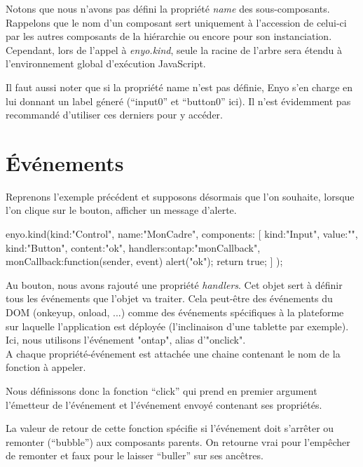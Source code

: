 \documentclass[11pt,a4paper]{report}
\begin{document}
Notons que nous n'avons pas défini la propriété \emph{name} des sous-composants. 
Rappelons que le nom d'un composant sert uniquement à l'accession de celui-ci par les 
autres composants de la hiérarchie ou encore pour son instanciation. Cependant, lors de
l'appel à \emph{enyo.kind}, seule la racine de l'arbre sera étendu à l'environnement global
d'exécution JavaScript.

Il faut aussi noter que si la propriété name n'est pas définie, Enyo s'en charge en lui donnant 
un label géneré (``input0'' et ``button0'' ici). Il n'est évidemment pas recommandé 
d'utiliser ces derniers pour y accéder.

\section{\'Evénements}\label{sec:event}

Reprenons l'exemple précédent et supposons désormais que l'on souhaite, lorsque l'on clique sur le bouton, afficher un message d'alerte.

\begin{JavaScript}
enyo.kind({kind:"Control",
           name:"MonCadre",
           components: [
             {kind:"Input", value:""},
             {kind:"Button", content:"ok",
              handlers:{ontap:"monCallback"},
              monCallback:function(sender, event){
                alert("ok");
                return true;
              }
             }
           ]
       	  });
\end{JavaScript}

Au bouton, nous avons rajouté une propriété \emph{handlers}. 
Cet objet sert à définir tous les événements que l'objet va traiter. 
Cela peut-être des événements du DOM (onkeyup, onload, ...) comme des événements 
spécifiques à la plateforme sur laquelle l'application est déployée 
(l'inclinaison d'une tablette par exemple). Ici, nous utilisons l'événement "ontap", alias d'"onclick".\\

A chaque propriété-événement est attachée une chaine contenant le nom de la fonction à appeler.

Nous définissons donc la fonction ``click'' qui prend en premier argument l'émetteur de 
l'événement et l'événement envoyé contenant ses propriétés.

La valeur de retour de cette fonction spécifie si l'événement doit s'arrêter ou 
remonter (``bubble'') aux composants parents. On retourne vrai pour l'empêcher de 
remonter et faux pour le laisser ``buller'' sur ses ancêtres.
\end{document}
